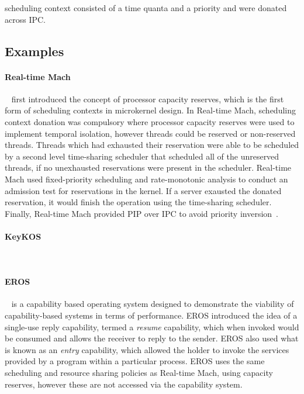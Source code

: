 \citet{Steinburg_WH_2005} scheduling context consisted of a time quanta and a priority and were donated across \gls{IPC}.

\subsection{Examples}

\paragraph{Real-time Mach}~\citep{Mercer_RZ_1994, Mercer_ST_1993} first introduced the concept of processor capacity reserves, which is the first form of scheduling contexts in microkernel design.
In Real-time Mach, scheduling context donation was compulsory where processor capacity reserves were used to implement temporal isolation, however threads could be reserved or non-reserved threads. 
Threads which had exhausted their reservation were able to be scheduled by a second level time-sharing scheduler that scheduled all of the unreserved threads, if no unexhausted reservations were present in the scheduler.
Real-time Mach used fixed-priority scheduling and rate-monotonic analysis to conduct an admission test for reservations in the kernel.
If a server exausted the donated reservation, it would finish the operation using the time-sharing scheduler. 
Finally, Real-time Mach provided \gls{PIP} over \gls{IPC} to avoid priority inversion~\citep{Tokuda_NR_1990}.

\paragraph{KeyKOS}~\citep{Bromberger_FFHLS_92}

\paragraph{EROS}~\citep{Shapiro_SF_99} is a capability based operating system designed to demonstrate the viability of capability-based systems in terms of performance. 
EROS introduced the idea of a single-use reply capability, termed a \emph{resume} capability, which when invoked would be consumed and allows the receiver to reply to the sender.
EROS also used what is known as an \emph{entry} capability, which allowed the holder to invoke the services provided by a program within a particular process. 
EROS uses the same scheduling and resource sharing policies as Real-time Mach, using capacity reserves, however these are not accessed via the capability system.


